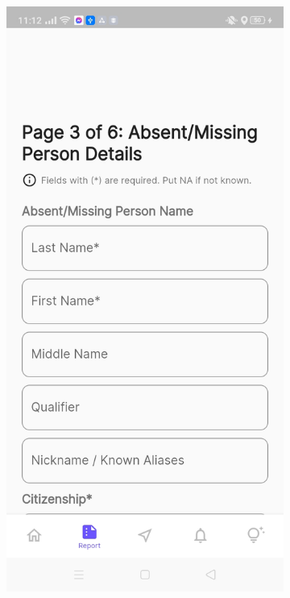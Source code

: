 \begin{figure}[!h]
    \centering
    \begin{subfigure}[c]{0.30\linewidth}
        \centering
        \includegraphics[scale=0.15]{figures/Chapter4/Main/p3-1.jpg}

\end{subfigure}
\end{figure}
